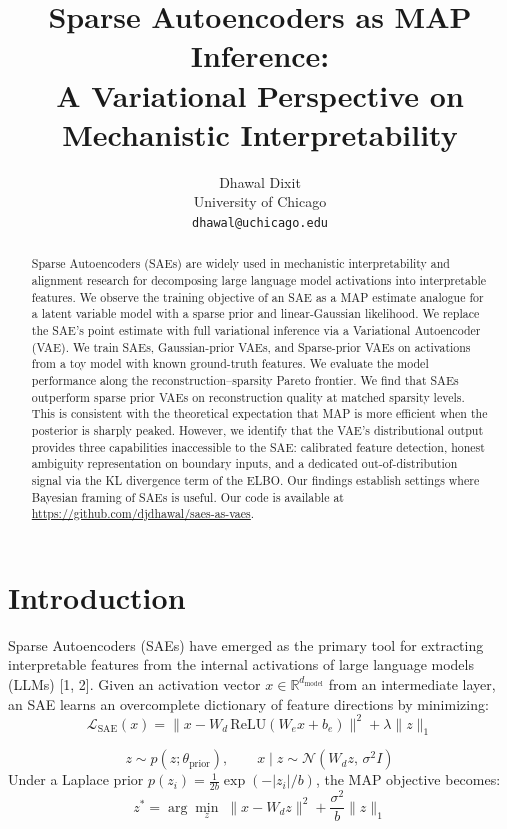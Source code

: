 \documentclass{article}
\title{Sparse Autoencoders as MAP Inference:\\ A Variational Perspective on Mechanistic Interpretability}
\author{%
  Dhawal Dixit \\
  University of Chicago\\
  \texttt{dhawal@uchicago.edu} \\
}
\begin{document}
\maketitle

\begin{abstract}
Sparse Autoencoders (SAEs) are widely used in mechanistic interpretability and alignment research for decomposing large language model activations into interpretable features. We observe the training objective of an SAE as a MAP estimate analogue for a latent variable model with a sparse prior and linear-Gaussian likelihood. We replace the SAE's point estimate with full variational inference via a Variational Autoencoder (VAE). We train SAEs, Gaussian-prior VAEs, and Sparse-prior VAEs on activations from a toy model with known ground-truth features. We evaluate the model performance along the reconstruction--sparsity Pareto frontier. We find that SAEs outperform sparse prior VAEs on reconstruction quality at matched sparsity levels. This is consistent with the theoretical expectation that MAP is more efficient when the posterior is sharply peaked. However, we identify that the VAE's distributional output provides three capabilities inaccessible to the SAE: calibrated feature detection, honest ambiguity representation on boundary inputs, and a dedicated out-of-distribution signal via the KL divergence term of the ELBO. Our findings establish settings where Bayesian framing of SAEs is useful. Our code is available at \url{https://github.com/djdhawal/saes-as-vaes}.
\end{abstract}

\section{Introduction}

Sparse Autoencoders (SAEs) have emerged as the primary tool for extracting interpretable features from the internal activations of large language models (LLMs) [1, 2]. Given an activation vector $x \in \mathbb{R}^{d_\text{model}}$ from an intermediate layer, an SAE learns an overcomplete dictionary of feature directions by minimizing:
\begin{equation}
\mathcal{L}_{\text{SAE}}(x) = \|x - W_d \, \text{ReLU}(W_e x + b_e)\|^2 + \lambda \|z\|_1
\label{eq:sae_loss}
\end{equation}

\begin{equation}
z \sim p(z; \theta_\text{prior}), \qquad x \mid z \sim \mathcal{N}(W_d z,\, \sigma^2 I)
\label{eq:generative}
\end{equation}
Under a Laplace prior $p(z_i) = \frac{1}{2b}\exp(-|z_i|/b)$, the MAP objective becomes:
\begin{equation}
z^* = \arg\min_z \;\|x - W_d z\|^2 + \frac{\sigma^2}{b}\|z\|_1
\end{equation}
\end{document}
